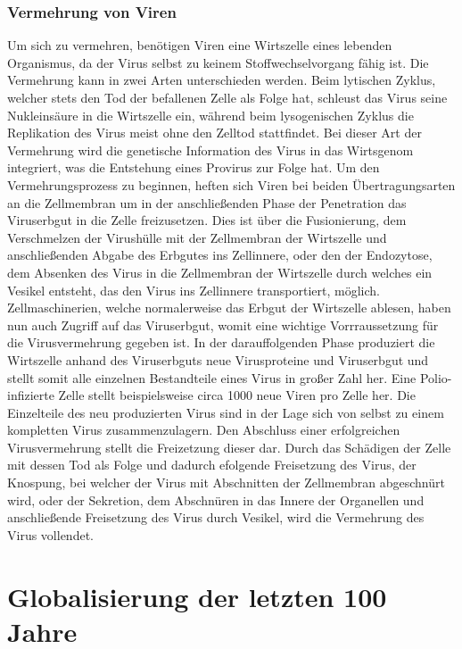 \documentclass[12pt]{article}
\begin{document}
\subsubsection{Vermehrung von Viren}
Um sich zu vermehren, benötigen Viren eine Wirtszelle eines lebenden Organismus, da der Virus selbst zu keinem Stoffwechselvorgang fähig ist. Die Vermehrung kann in zwei Arten unterschieden werden. Beim lytischen Zyklus, welcher stets den Tod der befallenen Zelle als Folge hat, schleust das Virus seine Nukleinsäure in die Wirtszelle ein, während beim lysogenischen Zyklus die Replikation des Virus meist ohne den Zelltod stattfindet. Bei dieser Art der Vermehrung wird die genetische Information des Virus in das Wirtsgenom integriert, was die Entstehung eines Provirus zur Folge hat. Um den Vermehrungsprozess zu beginnen, heften sich Viren bei beiden Übertragungsarten an die Zellmembran um in der anschließenden Phase der Penetration das Viruserbgut in die Zelle freizusetzen. Dies ist über die Fusionierung, dem Verschmelzen der Virushülle mit der Zellmembran der Wirtszelle und anschließenden Abgabe des Erbgutes ins Zellinnere, oder den der Endozytose, dem Absenken des Virus in die Zellmembran der Wirtszelle durch welches ein Vesikel entsteht, das den Virus ins Zellinnere transportiert, möglich. Zellmaschinerien, welche normalerweise das Erbgut der Wirtszelle ablesen, haben nun auch Zugriff auf das Viruserbgut, womit eine wichtige Vorrraussetzung für die Virusvermehrung gegeben ist. In der darauffolgenden Phase produziert die Wirtszelle anhand des Viruserbguts neue Virusproteine und Viruserbgut und stellt somit alle einzelnen Bestandteile eines Virus in großer Zahl her. Eine Polio-infizierte Zelle stellt beispielsweise circa 1000 neue Viren pro Zelle her. Die Einzelteile des neu produzierten Virus sind in der Lage sich von selbst zu einem kompletten Virus zusammenzulagern. Den Abschluss einer erfolgreichen Virusvermehrung stellt die Freizetzung dieser dar. Durch das Schädigen der Zelle mit dessen Tod als Folge und dadurch efolgende Freisetzung des Virus, der Knospung, bei welcher der Virus mit Abschnitten der Zellmembran abgeschnürt wird, oder der Sekretion, dem Abschnüren in das Innere der Organellen und anschließende Freisetzung des Virus durch Vesikel, wird die Vermehrung des Virus vollendet.
\section{Globalisierung der letzten 100 Jahre}
\end{document}

